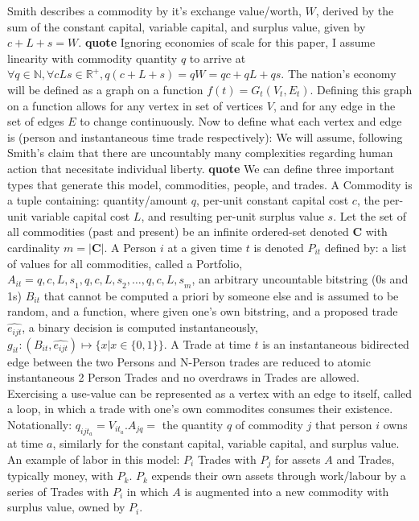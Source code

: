 \documentclass[12pt]{article}
\begin{document}
Smith describes a commodity by it's exchange value/worth, $W$, derived by the sum of the constant capital, variable capital, and surplus value, given by $c + L + s = W$. \textbf{quote}
Ignoring economies of scale for this paper, I assume linearity with commodity quantity $q$ to arrive at $\forall q \in \mathbb{N}, \forall{cLs} \in \mathbb{R^{+}}, q(c + L + s) = qW = qc + qL + qs $.
The nation's economy will be defined as a graph on a function $f(t) = G_t(V_t, E_t)$. 
Defining this graph on a function allows for any vertex in set of vertices $V$, and for any edge in the set of edges $E$ to change continuously.
Now to define what each vertex and edge is (person and instantaneous time trade respectively): We will assume, following Smith's claim that there are uncountably many complexities regarding human action that necesitate individual liberty. \textbf{quote} 
We can define three important types that generate this model, commodities, people, and trades.
A Commodity is a tuple containing: quantity/amount $q$, per-unit constant capital cost $c$, the per-unit variable capital cost $L$, and resulting per-unit surplus value $s$. 
Let the set of all commodities (past and present) be an infinite ordered-set denoted $\boldsymbol{C}$ with cardinality $m = |\boldsymbol{C}|$.
A Person $i$ at a given time $t$ is denoted $P_{it}$ defined by: a list of values for all commodities, called a Portfolio, $A_{it} = {{q, c, L, s}_{1}, {q, c, L, s}_{2},\ldots,{q, c, L, s}_{m}}$, an arbitrary uncountable bitstring (0s and 1s) $B_{it}$ that cannot be computed a priori by someone else and is assumed to be random, and a function, where given one's own bitstring, and a proposed trade $\hat{e_{ijt}}$, a binary decision is computed instantaneously, $g_{it} : (B_{it}, \hat{e_{ijt}}) \mapsto \{x | x \in  \{0, 1\}\}$. 
A Trade at time $t$ is an instantaneous bidirected edge between the two Persons and N-Person trades are reduced to atomic instantaneous 2 Person Trades and no overdraws in Trades are allowed. 
Exercising a use-value can be represented as a vertex with an edge to itself, called a loop, in which a trade with one's own commodites consumes their existence.
Notationally: $q_{ijt_{a}} = V_{it_{a}}.A_{jq} =$ the quantity $q$ of commodity $j$ that person $i$ owns at time $a$, similarly for the constant capital, variable capital, and surplus value.
An example of labor in this model: $P_i$ Trades with $P_j$ for assets $A$ and Trades, typically money, with $P_k$.
$P_k$ expends their own assets through work/labour by a series of Trades with $P_i$ in which $A$ is augmented into a new commodity with surplus value, owned by $P_i$.  
\end{document}
